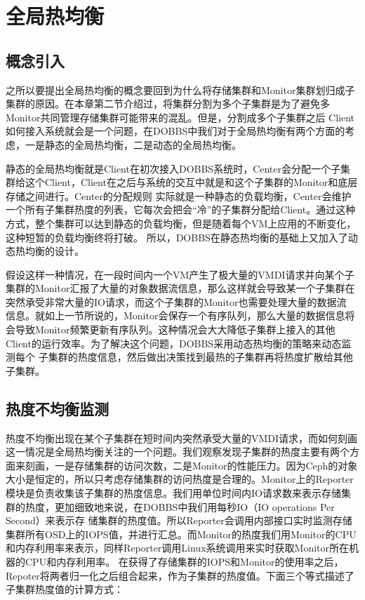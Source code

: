\section{全局热均衡}
\subsection{概念引入}
之所以要提出全局热均衡的概念要回到为什么将存储集群和Monitor集群划归成子集群的原因。在本章第二节介绍过，将集群分割为多个子集群是为了避免多Monitor共同管理存储集群可能带来的混乱。但是，分割成多个子集群之后
Client如何接入系统就会是一个问题，在DOBBS中我们对于全局热均衡有两个方面的考虑，一是静态的全局热均衡，二是动态的全局热均衡。

静态的全局热均衡就是Client在初次接入DOBBS系统时，Center会分配一个子集群给这个Client，Client在之后与系统的交互中就是和这个子集群的Monitor和底层存储之间进行。Center的分配规则
实际就是一种静态的负载均衡，Center会维护一个所有子集群热度的列表，它每次会把会“冷”的子集群分配给Client。通过这种方式，整个集群可以达到静态的负载均衡，但是随着每个VM上应用的不断变化，这种短暂的负载均衡终将打破。
所以，DOBBS在静态热均衡的基础上又加入了动态热均衡的设计。

假设这样一种情况，在一段时间内一个VM产生了极大量的VMDI请求并向某个子集群的Monitor汇报了大量的对象数据流信息，那么这样就会导致某一个子集群在突然承受非常大量的IO请求，而这个子集群的Monitor也需要处理大量的数据流
信息。就如上一节所说的，Monitor会保存一个有序队列，那么大量的数据信息将会导致Monitor频繁更新有序队列。这种情况会大大降低子集群上接入的其他Client的运行效率。为了解决这个问题，DOBBS采用动态热均衡的策略来动态监测每个
子集群的热度信息，然后做出决策找到最热的子集群再将热度扩散给其他子集群。

\subsection{热度不均衡监测}
热度不均衡出现在某个子集群在短时间内突然承受大量的VMDI请求，而如何刻画这一情况是全局热均衡关注的一个问题。我们观察发现子集群的热度主要有两个方面来刻画，一是存储集群的访问次数，二是Monitor的性能压力。因为Ceph的对象
大小是恒定的，所以只考虑存储集群的访问热度是合理的。Monitor上的Reporter模块是负责收集该子集群的热度信息。我们用单位时间内IO请求数来表示存储集群的热度，更加细致地来说，在DOBBS中我们用每秒IO（IO operations Per Second）来表示存
储集群的热度值。所以Reporter会调用内部接口实时监测存储集群所有OSD上的IOPS值，并进行汇总。而Monitor的热度我们用Monitor的CPU和内存利用率来表示，同样Reporter调用Linux系统调用来实时获取Monitor所在机器的CPU和内存利用率。
在获得了存储集群的IOPS和Monitor的使用率之后，Repoter将两者归一化之后组合起来，作为子集群的热度值。下面三个等式描述了子集群热度值的计算方式：



